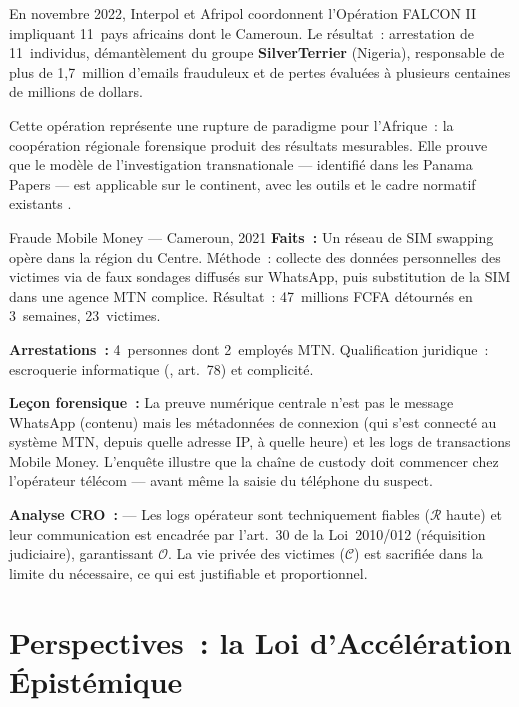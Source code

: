 En novembre 2022, Interpol et Afripol coordonnent l'Opération FALCON II
impliquant 11~pays africains dont le Cameroun. Le résultat~: arrestation
de 11~individus, démantèlement du groupe \textbf{SilverTerrier} (Nigeria),
responsable de plus de 1,7~million d'emails frauduleux et de pertes évaluées
à plusieurs centaines de millions de dollars.

\medskip

Cette opération représente une rupture de paradigme pour l'Afrique~:
la coopération régionale forensique produit des résultats mesurables. Elle
prouve que le modèle de l'investigation transnationale --- identifié dans les
Panama Papers --- est applicable sur le continent, avec les outils et le
cadre normatif existants \cite{m0pnc}.

\begin{boxscenario}{Fraude Mobile Money --- Cameroun, 2021}
\textbf{Faits~:} Un réseau de SIM swapping opère dans la région du Centre.
Méthode~: collecte des données personnelles des victimes via de faux sondages
diffusés sur WhatsApp, puis substitution de la SIM dans une agence MTN
complice. Résultat~: 47~millions FCFA détournés en 3~semaines, 23~victimes.

\textbf{Arrestations~:} 4~personnes dont 2~employés MTN. Qualification
juridique~: escroquerie informatique (, art.~78)
et complicité.

\textbf{Leçon forensique~:} La preuve numérique centrale n'est pas le
message WhatsApp (contenu) mais les métadonnées de connexion (qui s'est
connecté au système MTN, depuis quelle adresse IP, à quelle heure) et
les logs de transactions Mobile Money. L'enquête illustre que la chaîne
de custody doit commencer chez l'opérateur télécom --- avant même la
saisie du téléphone du suspect.

\textbf{Analyse CRO~:} \cro{$\downarrow$}{$\uparrow$}{$\uparrow$} --- Les logs
opérateur sont techniquement fiables ($\mathcal{R}$ haute) et leur
communication est encadrée par l'art.~30 de la Loi~2010/012 (réquisition
judiciaire), garantissant $\mathcal{O}$. La vie privée des victimes
($\mathcal{C}$) est sacrifiée dans la limite du nécessaire, ce qui est
justifiable et proportionnel.
\end{boxscenario}

\section{Perspectives~: la Loi d'Accélération Épistémique}

